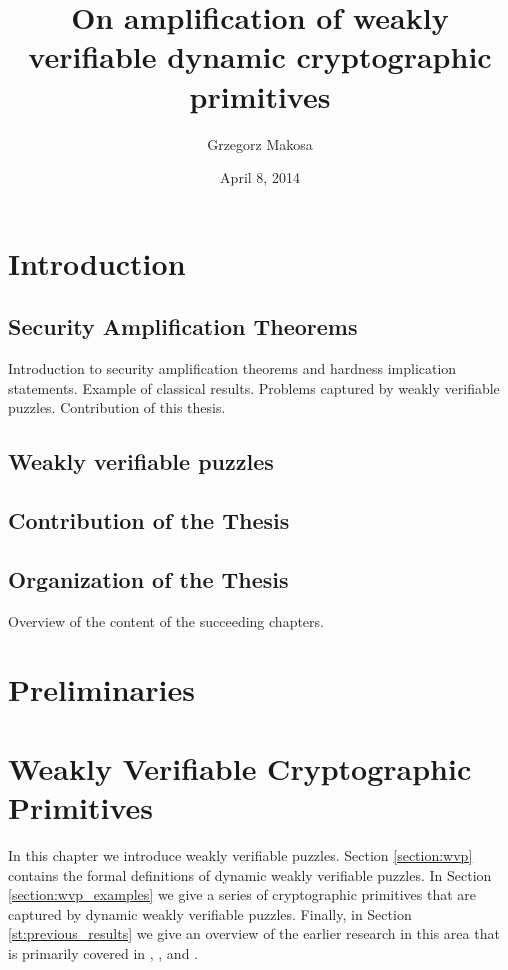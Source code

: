 \documentclass[11pt,a4paper,titlepage]{memoir}
\title{On amplification of weakly verifiable dynamic cryptographic primitives}
\author{Grzegorz Makosa}
\date{April 8, 2014}
\begin{document}
\frontmatter

%

\cleartorecto
\tableofcontents
\mainmatter

\chapter{Introduction}

\section{Security Amplification Theorems}
Introduction to security amplification theorems and hardness implication statements.
Example of classical results. Problems captured by weakly verifiable puzzles.
Contribution of this thesis.
\section{Weakly verifiable puzzles}
\section{Contribution of the Thesis}
\section{Organization of the Thesis}
Overview of the content of the succeeding chapters.

\chapter{Preliminaries}


\chapter{Weakly Verifiable Cryptographic Primitives}
In this chapter we introduce weakly verifiable puzzles.
Section \ref{section:wvp} contains the formal definitions of dynamic weakly verifiable puzzles.
In Section \ref{section:wvp_examples} we give a series of cryptographic primitives that are captured by dynamic weakly verifiable puzzles.
Finally, in Section \ref{st:previous_results} we give an overview of the earlier research in this area
that is primarily covered in \cite{canetti2004hardness}, \cite{Dodis:2009:SAI:1530441.1530450}, and \cite{DBLP:journals/corr/abs-1002-3534}.
\end{document}
